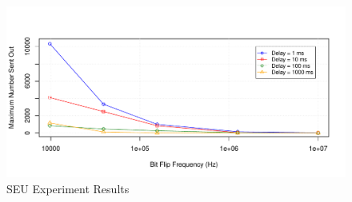 
\begin{figure}
\centering
\includegraphics[scale=0.4]{figures/experiment1.pdf}
\caption{SEU Experiment Results}
\vspace{5pt}
\label{fig:exp1_result}
\end{figure}



